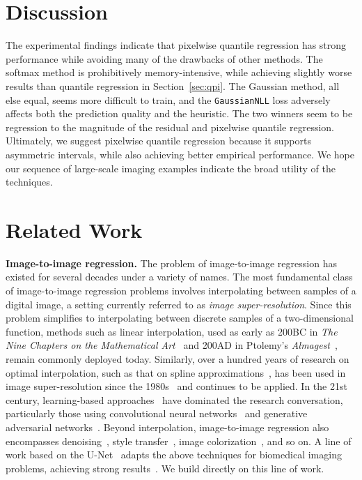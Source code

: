 \documentclass[10pt]{article}
\begin{document}
\section{Discussion}
The experimental findings indicate that pixelwise quantile regression has strong performance while avoiding many of the drawbacks of other methods.
The softmax method is prohibitively memory-intensive, while achieving slightly worse results than quantile regression in Section~\ref{sec:qpi}.
The Gaussian method, all else equal, seems more difficult to train, and the \texttt{GaussianNLL} loss adversely affects both the prediction quality and the heuristic.
The two winners seem to be regression to the magnitude of the residual and pixelwise quantile regression.
Ultimately, we suggest pixelwise quantile regression because it supports asymmetric intervals, while also achieving better empirical performance.
We hope our sequence of large-scale imaging examples indicate the broad utility of the techniques.

\section{Related Work}
\textbf{Image-to-image regression.} The problem of image-to-image regression has existed for several decades under a variety of names.
The most fundamental class of image-to-image regression problems involves interpolating between samples of a digital image, a setting currently referred to as \emph{image super-resolution}.
Since this problem simplifies to interpolating between discrete samples of a two-dimensional function, methods such as linear interpolation, used as early as 200BC in \emph{The Nine Chapters on the Mathematical Art}~\cite{nineChapters200BC,needham1959science} and 200AD in Ptolemy's \emph{Almagest}~\cite{ptolemy200ADalmagest}, remain commonly deployed today.
Similarly, over a hundred years of research on optimal interpolation, such as that on spline approximations~\cite{hahn1918interpolationsproblems,whitney1953polya,walsh1962best}, has been used in image super-resolution since the 1980s~\cite{keys1981cubic} and continues to be applied.
In the 21st century, learning-based approaches~\cite{freeman2002example,chang2004super,yang2010image} have dominated the research conversation, particularly those using convolutional neural networks~\cite{dong2014learning,dong2015image,johnson2016perceptual} and generative adversarial networks~\cite{goodfellow2014generative,ledig2017photo}.
Beyond interpolation, image-to-image regression also encompasses denoising~\cite{buades2005review,buades2005nonlocal,burger2012image,tian2020deep,goyal2020image}, style transfer~\cite{gatys2016image,isola2017image,zhu2017unpaired,jing2020style}, image colorization~\cite{zhang2016colorful}, and so on. 
A line of work based on the U-Net~\cite{ronneberger2015u} adapts the above techniques for biomedical imaging problems, achieving strong results~\cite{zbontar2018attention,zhou2018unetplusplus}.
We build directly on this line of work.
\end{document}

